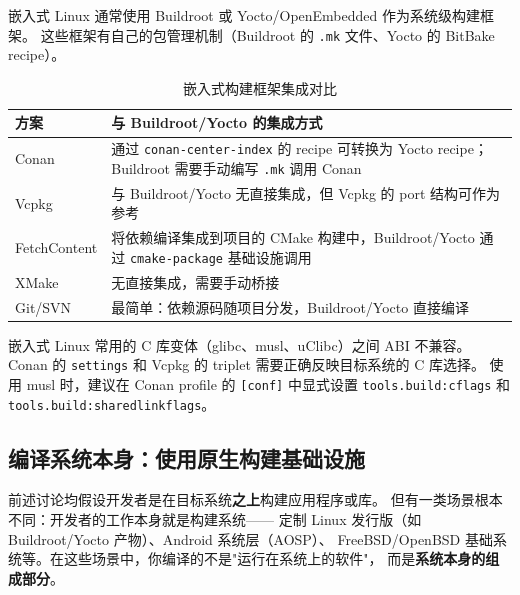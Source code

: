 \documentclass[12pt,a4paper,fontset=fandol]{ctexbook}
\begin{document}
嵌入式 Linux 通常使用 Buildroot 或 Yocto/OpenEmbedded 作为系统级构建框架。
这些框架有自己的包管理机制（Buildroot 的 \texttt{.mk} 文件、Yocto 的 BitBake recipe）。

\begin{table}[H]
\centering
\caption{嵌入式构建框架集成对比}
\label{tab:embedded-framework}
\small
\begin{tabularx}{\textwidth}{l >{\raggedright\arraybackslash}X}
\toprule
\textbf{方案} & \textbf{与 Buildroot/Yocto 的集成方式} \\
\midrule
Conan      & 通过 \texttt{conan-center-index} 的 recipe 可转换为 Yocto recipe；
             Buildroot 需要手动编写 \texttt{.mk} 调用 Conan \\
Vcpkg      & 与 Buildroot/Yocto 无直接集成，但 Vcpkg 的 port 结构可作为参考 \\
FetchContent & 将依赖编译集成到项目的 CMake 构建中，Buildroot/Yocto 通过
               \texttt{cmake-package} 基础设施调用 \\
XMake      & 无直接集成，需要手动桥接 \\
Git/SVN    & 最简单：依赖源码随项目分发，Buildroot/Yocto 直接编译 \\
\bottomrule
\end{tabularx}
\end{table}

\begin{warning}[ title={嵌入式场景下的 ABI 注意事项}]
嵌入式 Linux 常用的 C 库变体（glibc、musl、uClibc）之间 ABI 不兼容。
Conan 的 \texttt{settings} 和 Vcpkg 的 triplet 需要正确反映目标系统的 C 库选择。
使用 musl 时，建议在 Conan profile 的 \texttt{[conf]} 中显式设置
\texttt{tools.build:cflags} 和 \texttt{tools.build:sharedlinkflags}。
\end{warning}

\subsection{编译系统本身：使用原生构建基础设施}

前述讨论均假设开发者是在目标系统\textbf{之上}构建应用程序或库。
但有一类场景根本不同：开发者的工作本身就是构建系统——
定制 Linux 发行版（如 Buildroot/Yocto 产物）、Android 系统层（AOSP）、
FreeBSD/OpenBSD 基础系统等。在这些场景中，你编译的不是"运行在系统上的软件"，
而是\textbf{系统本身的组成部分}。
\end{document}
